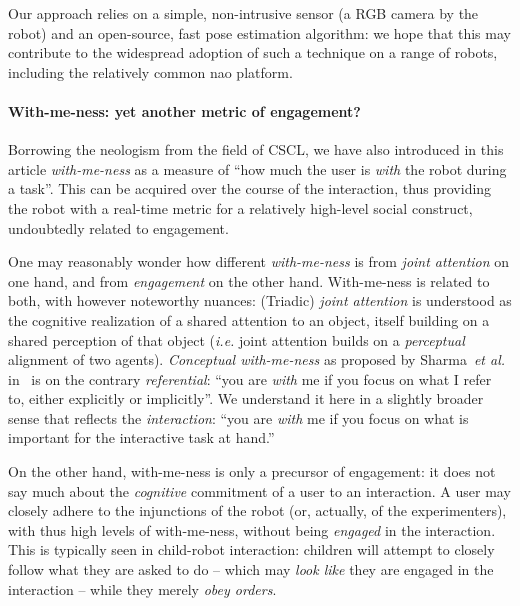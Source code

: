 \documentclass{sig-alternate}
\newcommand{\etal}{\textit{et al.}\xspace}
\newcommand{\ie}{\textit{i.e.}\xspace}
\begin{document}
Our approach relies on a simple, non-intrusive sensor (a RGB camera by the
robot) and an open-source, fast pose estimation algorithm: we hope that this may contribute to the widespread
adoption of such a technique on a range of robots, including the relatively
common {\sc nao} platform.


\paragraph{With-me-ness: yet another metric of engagement?}

Borrowing the neologism from the field of CSCL, we have also introduced in this
article \emph{with-me-ness} as a measure of ``how much the user is \emph{with}
the robot during a task''. This can be acquired over the course of the
interaction, thus providing the robot with a real-time metric for a relatively
high-level social construct, undoubtedly related to engagement.

One may reasonably wonder how different \emph{with-me-ness} is from \emph{joint
attention} on one hand, and from \emph{engagement} on the other hand.
With-me-ness is related to both, with however noteworthy nuances: (Triadic)
\emph{joint attention} is understood as the cognitive realization of a shared
attention to an object, itself building on a shared perception of that object
(\ie joint attention builds on a \emph{perceptual} alignment of two agents).
\emph{Conceptual with-me-ness} as proposed by Sharma~\etal
in~\cite{sharma2014me} is on the contrary \emph{referential}: ``you are
\emph{with} me if you focus on what I refer to, either explicitly or
implicitly''. We understand it here in a slightly broader sense that reflects
the \emph{interaction}: ``you are \emph{with} me if you focus on what is
important for the interactive task at hand.''

On the other hand, with-me-ness is only a precursor of engagement: it does not
say much about the \emph{cognitive} commitment of a user to an interaction. A
user may closely adhere to the injunctions of the robot (or, actually, of the
experimenters), with thus high levels of with-me-ness,  without being
\emph{engaged} in the interaction. This is typically seen in child-robot
interaction: children will attempt to closely follow what they are asked to do
-- which may \emph{look like} they are engaged in the interaction -- while they
merely \emph{obey orders}.
\end{document}
